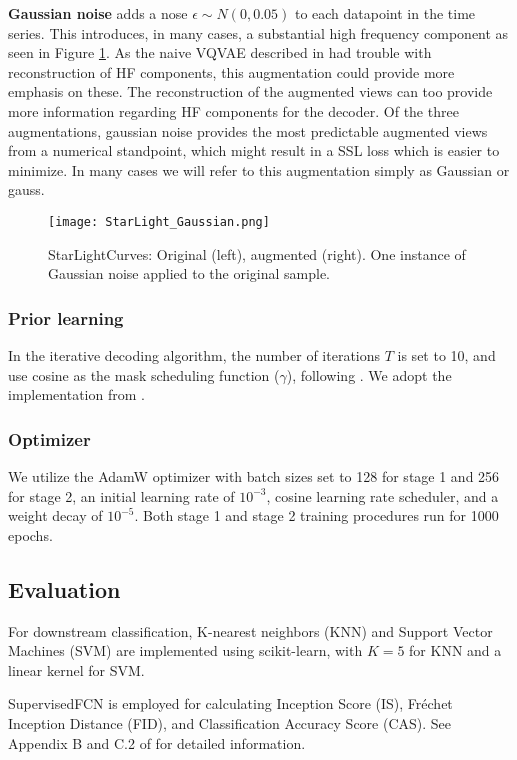 \documentclass[../../thesis.tex]{subfiles}
\begin{document}
\textbf{Gaussian noise} adds a nose $\epsilon \sim N(0,0.05)$ to each datapoint in the time series. This introduces, in many cases, a substantial high frequency component as seen in Figure \ref{fig:StarLight_Gaussian}. As the naive VQVAE described in \cite{TimeVQVAE} had trouble with reconstruction of HF components, this augmentation could provide more emphasis on these. The reconstruction of the augmented views can too provide more information regarding HF components for the decoder. Of the three augmentations, gaussian noise provides the most predictable augmented views from a numerical standpoint, which might result in a SSL loss which is easier to minimize. In many cases we will refer to this augmentation simply as Gaussian or gauss.
\begin{figure}[h]
    \texttt{[image: StarLight\_Gaussian.png]}
    \centering
    \caption{StarLightCurves: Original (left), augmented (right). One instance of Gaussian noise applied to the original sample.}
    \label{fig:StarLight_Gaussian}
\end{figure}


\subsubsection{Prior learning}
In the iterative decoding algorithm, the number of iterations $T$ is set to 10, and use cosine as the mask scheduling function ($\gamma$), following \cite{chang2022maskgit}. We adopt the implementation from \cite{TimeVQVAE}.

\subsubsection{Optimizer}
We utilize the AdamW optimizer with batch sizes set to 128 for stage 1 and 256 for stage 2, an initial learning rate of $10^{-3}$, cosine learning rate scheduler, and a weight decay of $10^{-5}$. Both stage 1 and stage 2 training procedures run for 1000 epochs.


\subsection{Evaluation}
For downstream classification, K-nearest neighbors (KNN) and Support Vector Machines (SVM) are implemented using scikit-learn, with $K=5$ for KNN and a linear kernel for SVM. \newline

SupervisedFCN is employed for calculating Inception Score (IS), Fréchet Inception Distance (FID), and Classification Accuracy Score (CAS). See Appendix B and C.2 of \cite{VQVAE} for detailed information.
\end{document}
